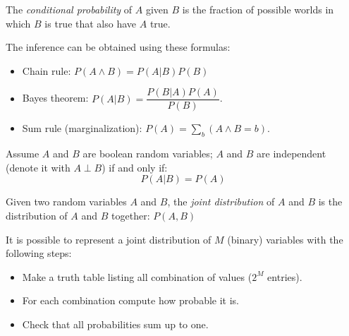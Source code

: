 \documentclass[12pt, a4paper]{report}
\newtheorem[style=M,bodystyle=\normalfont]{theorem}{Theorem}
\newtheorem[style=M,bodystyle=\normalfont]{corollary}{Corollary}
\newtheorem[style=M,bodystyle=\normalfont]{lemma}{Lemma}
\newtheorem[style=M,bodystyle=\normalfont]{definition}{Definition}
\begin{document}
    \begin{definition}
        The \emph{conditional probability} of $A$ given $B$ is the fraction of possible worlds in which $B$ is true that also have $A$ true. 
    \end{definition}
    The inference can be obtained using these formulas: 
    \begin{itemize}
        \item Chain rule: $P(A \land B)=P(A|B)P(B)$
        \item Bayes theorem: $P(A|B)=\dfrac{P(B|A)P(A)}{P(B)}$.
        \item Sum rule (marginalization): $P(A)=\sum_{b}{(A \land B=b)}$.
    \end{itemize}
    \begin{definition}
        Assume $A$ and $B$ are boolean random variables; $A$ and $B$ are independent (denote it with $A \perp B$) if and only if:
        \[P(A|B)=P(A)\]

        Given two random variables $A$ and $B$, the \emph{joint distribution} of $A$ and $B$ is the distribution of $A$ and $B$ together: $P(A,B)$
    \end{definition}
    It is possible to represent a joint distribution of $M$ (binary) variables with the following steps:
    \begin{itemize}
        \item Make a truth table listing all combination of values ($2^M$ entries).
        \item For each combination compute how probable it is. 
        \item Check that all probabilities sum up to one. 
    \end{itemize}
\end{document}
